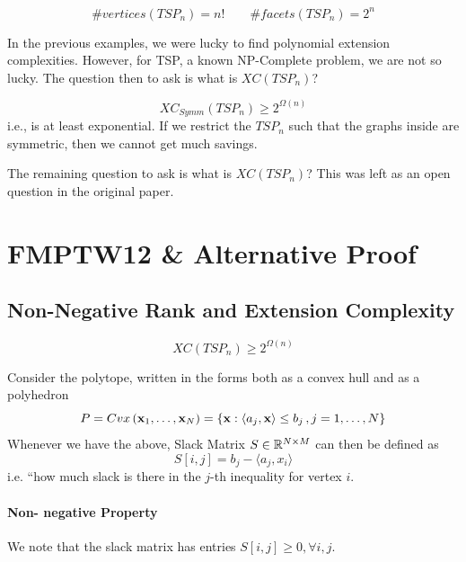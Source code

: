 \begin{proposition}
	\begin{equation}
		\# vertices (TSP_n) = n! \quad \quad \# facets (TSP_n) = 2^n
	\end{equation}
\end{proposition}
 
In the previous examples, we were lucky to find polynomial extension complexities. However, for TSP, a known NP-Complete problem, we are not so lucky. The question then to ask is what is $XC(TSP_n)$? 

\begin{theorem}
	\begin{equation}
		XC_{Symm} (TSP_n) \geq 2^{\Omega(n)}
	\end{equation}
	i.e., is at least exponential. If we restrict the $TSP_n$ such that the graphs inside are symmetric, then we cannot get much savings. 
\end{theorem}

The remaining question to ask is what is $XC(TSP_n)$? This was left as an open question in the original paper. 

\section{FMPTW12 \& Alternative Proof}
\subsection{Non-Negative Rank and Extension Complexity}
\begin{theorem}
	\begin{equation}
		XC(TSP_n) \geq 2 ^{\Omega (n)}
	\end{equation}
	\label{thm:FMPTW12}
\end{theorem}

\begin{definition}
	Consider the polytope, written in the forms both as a convex hull and as a polyhedron
	\begin{equation}
		P = Cvx\left( \mathbf{x}_1, \dots, \mathbf{x}_N \right) = \{\mathbf{x}: \langle a_j , \mathbf{x} \rangle \leq b_j\,, j = 1, \dots, N \} 
	\end{equation}
	Whenever we have the above, Slack Matrix $S \in \mathbb{R}^{N \times M}$ can then be defined as 
	\begin{equation}
		S[i,j] = b_j - \langle a_j , x_i \rangle
	\end{equation}
	i.e. ``how much slack is there in the $j$-th inequality for vertex $i$. 
	
	\paragraph{Non- negative Property} We note that the slack matrix has entries $S[i, j] \geq 0, \forall i, j$. 
\end{definition}

